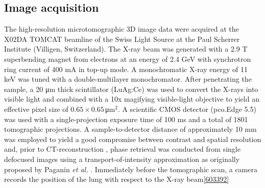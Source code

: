 \subsection{Image acquisition}\label{sec:acquisition}
The high-resolution microtomographic 3D image data were acquired at the X02DA TOMCAT beamline of the Swiss Light Source at the Paul Scherrer Institute (Villigen, Switzerland). The X-ray beam was generated with a 2.9 T superbending magnet from electrons at an energy of 2.4 GeV with synchrotron ring current of 400 mA in top-up mode. A monochromatic X-ray energy of 11 keV was tuned with a double-multilayer monochromator. After penetrating the sample, a 20 μm thick scintillator (LuAg:Ce) was used to convert the X-rays into visible light and combined with a 10x magifying visible-light objective to yield an effective pixel size of $0.65 \times 0.65\,$μm$^2$. A scientific CMOS detector (pco.Edge 5.5) was used with a single-projection exposure time of 100 ms and a total of 1801 tomographic projections. A sample-to-detector distance of approximately 10 mm was employed to yield a good compromise between contrast and spatial resolution and, prior to CT-reconstruction \cite{Marone2012}, phase retrieval was conducted from single defocused images using a transport-of-intensity approximation as originally proposed by Paganin \textit{et al.} \cite{Paganin2002}. Immediately before the tomographic scan, a camera records the position of the lung with respect to the X-ray beam\ref{603392}


